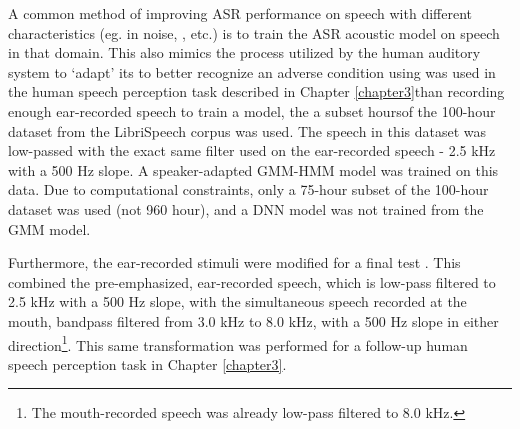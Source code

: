 A common method of improving ASR performance on speech with different characteristics (eg. in noise, \DIFdelbegin {}\DIFdelend \DIFaddbegin {}\DIFaddend , etc.) is to train the ASR acoustic model on speech in that domain.  This also mimics the process utilized by the human auditory system to `adapt' its \DIFdelbegin {}\DIFdelend \DIFaddbegin {}\DIFaddend to better recognize an adverse condition using \DIFdelbegin {}\DIFdelend \DIFaddbegin {}\DIFaddend was used in the human speech perception task described in Chapter \ref{chapter3}\DIFdelbegin {}\DIFdelend \DIFaddbegin {}\DIFaddend than recording enough ear-recorded speech to train a model, the a subset \DIFdelbegin {}\DIFdelend \DIFaddbegin \DIFadd{(} hours\DIFaddbegin \DIFadd{) }\DIFaddend of the 100-hour dataset from the LibriSpeech corpus was used.  The speech in this dataset was low-passed with the exact same filter used on the ear-recorded speech - 2.5 kHz with a 500 Hz slope.  A speaker-adapted GMM-HMM model was trained on this data.  Due to computational constraints, only a 75-hour subset of the 100-hour dataset was used (not 960 hour), and a DNN model was not trained from the GMM model.

Furthermore, the ear-recorded stimuli were modified for a final test \DIFaddbegin {}\DIFaddend .  This combined the pre-emphasized, ear-recorded speech, which is low-pass filtered to 2.5 kHz with a 500 Hz slope, with the simultaneous speech recorded at the mouth, \DIFdelbegin {}\DIFdelend bandpass filtered from 3.0 kHz to 8.0 kHz, with a 500 Hz slope in either direction\footnote{The mouth-recorded speech was already low-pass filtered to 8.0 kHz.}. This \DIFaddbegin {}\DIFaddend same transformation was performed \DIFdelbegin {}\DIFdelend for a follow-up human speech perception task in Chapter \ref{chapter3}.
\DIFdelbegin {}\DIFdelend 



